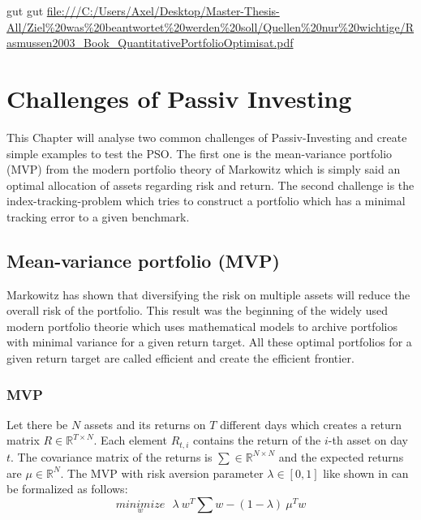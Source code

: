 \documentclass[
  oneside]{book}
\begin{document}
gut gut
\url{file:///C:/Users/Axel/Desktop/Master-Thesis-All/Ziel\%20was\%20beantwortet\%20werden\%20soll/Quellen\%20nur\%20wichtige/Rasmussen2003_Book_QuantitativePortfolioOptimisat.pdf}

\hypertarget{challenges}{%
\chapter{Challenges of Passiv Investing}\label{challenges}}

This Chapter will analyse two common challenges of Passiv-Investing and create simple examples to test the PSO. The first one is the mean-variance portfolio (MVP) from the modern portfolio theory of Markowitz which is simply said an optimal allocation of assets regarding risk and return. The second challenge is the index-tracking-problem which tries to construct a portfolio which has a minimal tracking error to a given benchmark.

\hypertarget{mean-variance-portfolio-mvp}{%
\section{Mean-variance portfolio (MVP)}\label{mean-variance-portfolio-mvp}}

Markowitz has shown that diversifying the risk on multiple assets will reduce the overall risk of the portfolio. This result was the beginning of the widely used modern portfolio theorie which uses mathematical models to archive portfolios with minimal variance for a given return target. All these optimal portfolios for a given return target are called efficient and create the efficient frontier.

\hypertarget{mvp}{%
\subsection{MVP}\label{mvp}}

Let there be \(N\) assets and its returns on \(T\) different days which creates a return matrix \(R \in \mathbb{R}^{T \times N}\). Each element \(R_{t,i}\) contains the return of the \(i\)-th asset on day \(t\). The covariance matrix of the returns is \(\textstyle\sum \in \mathbb{R}^{N \times N}\) and the expected returns are \(\mu \in \mathbb{R}^{N}\). The MVP with risk aversion parameter \(\lambda \in [0,1]\) like shown in \citep{Mari2005} can be formalized as follows:
\begin{equation} 
\underset{w}{minimize} \ \ \ \lambda \ w^T \textstyle\sum w - (1-\lambda) \ \mu^T w
\label{eq:MVP}
\end{equation}
\end{document}
